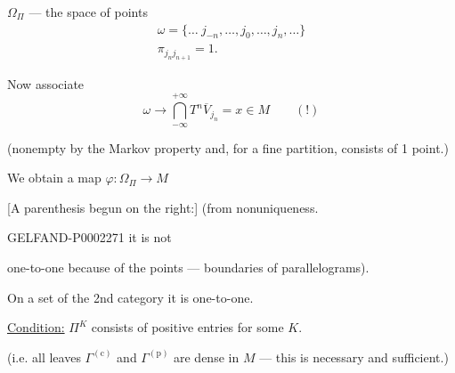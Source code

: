 $\Omega_\Pi$ — the space of points
\begin{equation*}
 \begin{gathered}
 \omega=\{\ldots\ j_{-n},\ldots, j_0,\ldots, j_n,\ldots\}\\
 \pi_{j_nj_{n+1}}=1.
 \end{gathered}
\end{equation*}



Now associate
\begin{equation*}
 \omega\longrightarrow\bigcap_{-\infty}^{+\infty}T^n\overline{V}_{j_n}
 =x\in M\qquad (!)
\end{equation*}



(nonempty by the Markov property and, for a fine partition, consists of 1 point.)



We obtain a map $\varphi:\Omega_\Pi\longrightarrow M$



[A parenthesis begun on the right:] (from nonuniqueness.



\begin{GelfandAdjacentEvidence}{GELFAND-P000227}{1}
it is not
\end{GelfandAdjacentEvidence}

one-to-one because of the points — boundaries of parallelograms).

On a set of the 2nd category it is one-to-one.



\underline{Condition:} $\Pi^K$ consists of positive entries for some $K$.



(i.e. all leaves $\Gamma^{(\mathrm{c})}$ and $\Gamma^{(\mathrm{p})}$ are dense in $M$ — this is necessary and sufficient.)



